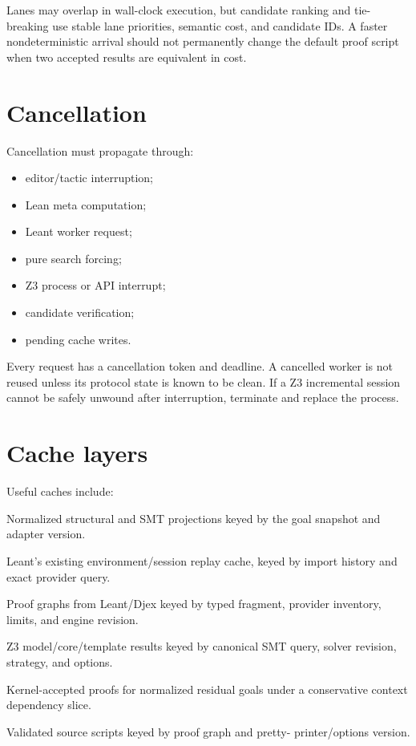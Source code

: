 \documentclass[11pt,letterpaper,openany]{report}
\begin{document}
Lanes may overlap in wall-clock execution, but candidate ranking and tie-breaking use
stable lane priorities, semantic cost, and candidate IDs. A faster nondeterministic
arrival should not permanently change the default proof script when two accepted
results are equivalent in cost.

\section{Cancellation}

Cancellation must propagate through:

\begin{itemize}
  \item editor/tactic interruption;
  \item Lean meta computation;
  \item Leant worker request;
  \item pure search forcing;
  \item Z3 process or API interrupt;
  \item candidate verification;
  \item pending cache writes.
\end{itemize}

Every request has a cancellation token and deadline. A cancelled worker is not reused
unless its protocol state is known to be clean. If a Z3 incremental session cannot be
safely unwound after interruption, terminate and replace the process.

\section{Cache layers}

Useful caches include:

\begin{description}[style=nextline,leftmargin=1.8em]
  \item[Projection cache] Normalized structural and SMT projections keyed by the goal
        snapshot and adapter version.
  \item[Provider cache] Leant's existing environment/session replay cache, keyed by
        import history and exact provider query.
  \item[Candidate cache] Proof graphs from Leant/Djex keyed by typed fragment,
        provider inventory, limits, and engine revision.
  \item[Solver cache] Z3 model/core/template results keyed by canonical SMT query,
        solver revision, strategy, and options.
  \item[Hole-proof cache] Kernel-accepted proofs for normalized residual goals under a
        conservative context dependency slice.
  \item[Rendering cache] Validated source scripts keyed by proof graph and pretty-
        printer/options version.
\end{description}
\end{document}
